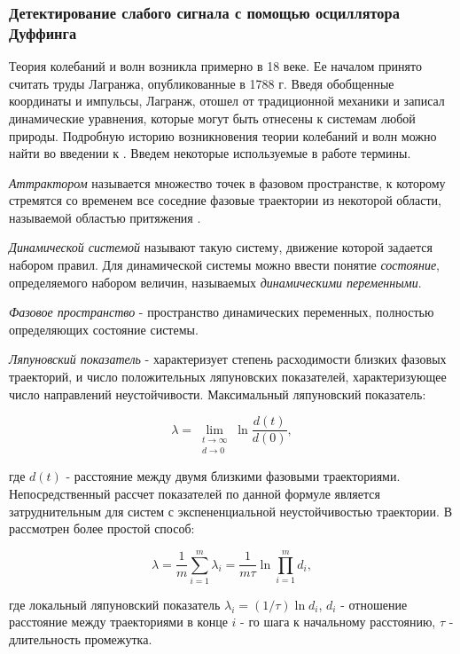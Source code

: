 \subsubsection{Детектирование слабого сигнала с помощью осциллятора Дуффинга}
\label{ssec:duffing}

Теория колебаний и волн возникла примерно в 18 веке. Ее началом принято считать труды Лагранжа, опубликованные в 1788 г. Введя обобщенные
координаты и импульсы, Лагранж, отошел от традиционной механики и записал динамические уравнения, которые могут быть отнесены к системам
любой природы. Подробную историю возникновения теории колебаний и волн можно найти во введении к \cite{landa_book}. 
Введем некоторые используемые в работе термины.

\emph{Аттрактором} называется множество точек в фазовом пространстве, к которому стремятся со
временем все соседние фазовые траектории из некоторой области, называемой областью притяжения \cite{landa_book}.

\emph{Динамической системой} называют такую систему, движение которой задается набором правил. Для динамической системы можно ввести
понятие \emph{состояние}, определяемого набором величин, называемых \emph{динамическими переменными}.

\emph{Фазовое пространство} - пространство динамических переменных, полностью определяющих состояние системы.

\emph{Ляпуновский показатель} - 
характеризует степень расходимости близких фазовых траекторий, и число положительных ляпуновских показателей, характеризующее число направлений
неустойчивости. Максимальный ляпуновский показатель:
\begin{center}
\begin{equation}
	\label{eq:exp_lyapunova_1}
	\lambda = \lim_{\substack{t \to \infty\\d \to 0}}\ln \frac{d(t)}{d(0)},
\end{equation}
\end{center}
где ${d(t)}$ - расстояние между двумя близкими фазовыми траекториями. Непосредственный рассчет показателей по данной формуле является
затруднительным для систем с экспененциальной неустойчивостью траектории. В \cite{landa_book} рассмотрен более простой способ:
\begin{center}
\begin{equation}
	\label{eq:exp_lyapunova_2}
	\lambda = \frac{1}{m}\sum \limits_{i=1}^m \lambda_i = \frac{1}{m\tau}\ln\prod \limits_{i=1}^md_i,
\end{equation}
\end{center}
где локальный ляпуновский показатель ${\lambda_i}=(1/ \tau)\ln d_i$, ${d_i}$ - отношение расстояние между траекториями в конце ${i}$ - го
шага к начальному расстоянию, ${\tau}$ - длительность промежутка.

